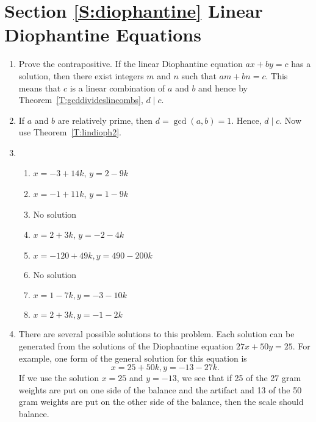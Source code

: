 \section*{Section \ref{S:diophantine} Linear Diophantine Equations}

\begin{enumerate}
\item Prove the contrapositive.  If the linear Diophantine equation $ax + by = c$ has a solution, then there exist integers $m$ and $n$ such that $am + bn = c$.  This means that $c$ is a linear combination of $a$ and $b$ and hence by Theorem~\ref{T:gcddivideslincombs}, $d \mid c$.


\item If $a$ and $b$ are relatively prime, then $d = \gcd \left( a, b \right) = 1$.  Hence, $d \mid c$.  Now use Theorem~\ref{T:lindioph2}.



\item \begin{enumerate}
\item $x = -3 + 14k$, \quad  $y = 2 - 9k$

\item $x = -1 + 11k$, \quad  $y = 1 - 9k$

\item No solution

\item $x = 2+3k$, \quad  $y = -2-4k$

\item $x = -120 + 49k, y = 490 - 200k$

\item No solution

\item $x = 1 - 7k, y = -3 - 10k$

\item $x = 2 + 3k, y = -1 - 2k$
\end{enumerate}


\item There are several possible solutions to this problem.  Each solution can be generated from the solutions of the Diophantine equation $27x + 50y = 25$.  For example, one form of the general solution for this equation is
\[
x = 25 + 50k, y = -13 - 27k.
\]
If we use the solution $x = 25$ and $y = -13$, we see that if 25 of the 27 gram weights are put on one side of the balance and the artifact and 13 of the  50 gram weights are put on the other side of the balance, then the scale should balance.


\end{enumerate}
